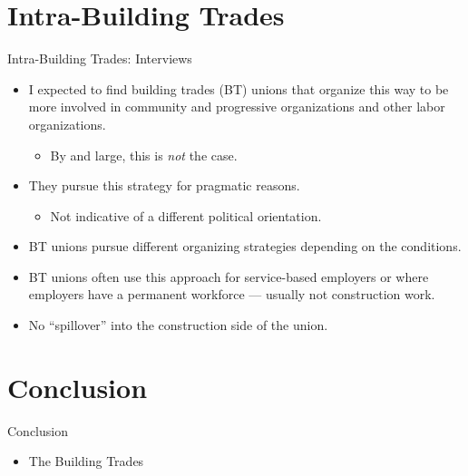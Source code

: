 \documentclass{beamer}
\begin{document}
\section{Intra-Building Trades}

\begin{frame}{Intra-Building Trades: Interviews}
	\begin{itemize}
		\item I expected to find building trades (BT) unions that organize this way to be more involved in community and progressive organizations and other labor organizations.
		\begin{itemize}
			\item By and large, this is \emph{not} the case.
		\end{itemize}
		\item They pursue this strategy for pragmatic reasons.
		\begin{itemize}
			\item Not indicative of a different political orientation.
		\end{itemize}
		\item BT unions pursue different organizing strategies depending on the conditions.
		\item BT unions often use this approach for service-based employers or where employers have a permanent workforce — usually not construction work.
		\item No “spillover” into the construction side of the union.
	\end{itemize}
\end{frame}



\section{Conclusion}
\begin{frame}{Conclusion}
  \begin{itemize}
  	\item The Building Trades 
  \end{itemize}
\end{frame}
\end{document}

